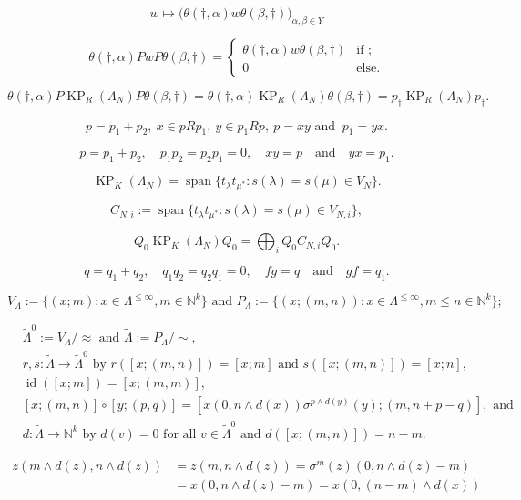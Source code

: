 \documentclass[a4paper,12pt]{article}
\begin{document}
\[w\mapsto \big( \theta(\dagger, \alpha)w\theta(\beta,\dagger )\big)_{\alpha,\beta\in Y}\]

\[\theta(\dagger,\alpha)PwP\theta(\beta,\dagger)=\begin{cases} \theta(\dagger,\alpha)w\theta(\beta,\dagger)&\text{if ;}\\0&\text{else}. \end{cases}\]

\[\theta(\dagger,\alpha)P\operatorname{KP}_R(\Lambda_N)P\theta(\beta,\dagger)=\theta(\dagger,\alpha)\operatorname{KP}_R(\Lambda_N)\theta(\beta,\dagger)=p_\dagger\operatorname{KP}_R(\Lambda_N)p_\dagger.\]

\[p=p_1+p_2,  \ x \in pRp_1,\   y \in p_1Rp,\ p=xy \text{ and } \ p_1=yx.\]

\begin{equation}\label{infinrels}
p=p_1+p_2,\quad p_1p_2=p_2p_1=0,\quad xy=p\quad \text{and}\quad yx=p_1.
\end{equation}

\[\operatorname{KP}_K(\Lambda_N)={\operatorname{\mathrm{span}}}\{t_\lambda t_{\mu^*}:s(\lambda)=s(\mu)\in V_N\}.\]

\[
C_{N,i}:={\operatorname{\mathrm{span}}}\{t_\lambda t_{\mu^*}:s(\lambda)=s(\mu)\in V_{N,i}\},
\]

\[Q_0\operatorname{KP}_K(\Lambda_N)Q_0=\bigoplus_i Q_0C_{N,i}Q_0.\]

\[
q=q_1+q_2,\quad q_1q_2=q_2q_1=0,\quad fg=q\quad \text{and}\quad gf=q_1.
\]

\[V_\Lambda:=\{(x;m):x \in \Lambda^{\leq \infty}, m \in {\mathbb{N}}^k\}\text{\ and\ }P_\Lambda:=\{(x;(m,n)):
x \in \Lambda^{\leq \infty}, m \leq n \in {\mathbb{N}}^k\};\]

\begin{align*}
&{\tilde{\Lambda}}^0 := V_\Lambda/\!\!\approx \text{\ and\ }{\tilde{\Lambda}} := P_{\Lambda}/\!\!\sim, \\
&r,s:{\tilde{\Lambda}} \to {\tilde{\Lambda}}^0  \text{ by } 
r([x;(m,n)]) = [x;m] \text{ and }
 s([x;(m,n)]) = [x;n],\\
&\operatorname{id}([x;m])=[x;(m,m)],\\
&[x;(m,n)] \circ [y;(p,q)] = [x(0,n \wedge d(x))\sigma^{p \wedge d(y)}(y);(m,n+p-q)],
\text{ and}\\
&d:{\tilde{\Lambda}} \to {\mathbb{N}}^k \text{ by } 
d(v) = 0 \text{ for all } v \in {\tilde{\Lambda}}^0 \text{ and }
d([x;(m,n)]) = n-m. 
\end{align*}

\begin{align*}
 z(m \wedge d(z),n \wedge d(z)) &= z(m,n \wedge d(z))= \sigma^m(z)(0, n \wedge d(z)-m)\\
&= x(0, n \wedge d(z)-m)= x(0, (n-m) \wedge d(x))
\end{align*}
\end{document}
